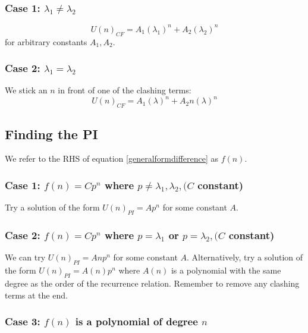 \documentclass{scrartcl}
\begin{document}
\subsubsection*{Case 1: $ \lambda_{1} \neq \lambda_{2} $}

\begin{equation}
U(n)_{CF} = A_{1} (\lambda_{1})^{n} + A_{2} (\lambda_{2})^{n}
\end{equation}
for arbitrary constants $ A_{1}, A_{2} $.

\subsubsection*{Case 2: $ \lambda_{1} = \lambda_{2} $}

We stick an $ n $ in front of one of the clashing terms:
\begin{equation}
U(n)_{CF} = A_{1} (\lambda)^{n} + A_{2} n(\lambda)^{n}
\end{equation}

\subsection{Finding the PI}

We refer to the RHS of equation \ref{generalformdifference} as $ f(n) $.

\subsubsection*{Case 1: $ f(n) = Cp^{n} $ where $ p \neq \lambda_{1}, \lambda_{2}, (C $ constant)}

Try a solution of the form $ U(n)_{PI} = Ap^{n} $ for some constant $ A $.

\subsubsection*{Case 2: $ f(n) = Cp^{n} $ where $ p = \lambda_{1} $ or $ p = \lambda_{2}, (C $ constant)}

We can try $ U(n)_{PI} = Anp^{n} $ for some constant $ A $. Alternatively, try a solution of the form $ U(n)_{PI} = A(n)p^{n} $ where $ A(n) $ is a polynomial with the same degree as the order of the recurrence relation. Remember to remove any clashing terms at the end.

\subsubsection*{Case 3: $ f(n) $ is a polynomial of degree $ n $}
\end{document}

